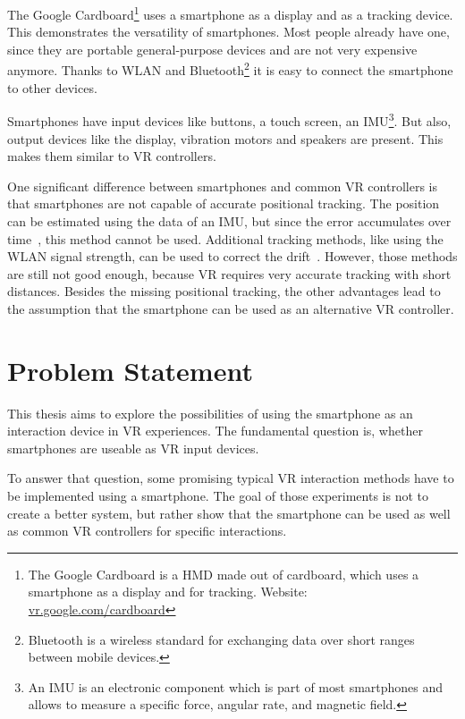 The Google Cardboard\footnote{The Google Cardboard is a \gls{HMD} made out of cardboard, which uses a smartphone as a display and for tracking. Website: \href{https://vr.google.com/cardboard/}{vr.google.com/cardboard}} uses a smartphone as a display and as a tracking device. This demonstrates the versatility of smartphones. Most people already have one, since they are portable general-purpose devices and are not very expensive anymore. Thanks to \gls{WLAN} and Bluetooth\footnote{Bluetooth is a wireless standard for exchanging data over short ranges between mobile devices.} it is easy to connect the smartphone to other devices.

Smartphones have input devices like buttons, a touch screen, an \gls{IMU}\footnote{An IMU is an electronic component which is part of most smartphones and allows to measure a specific force, angular rate, and magnetic field.}. But also, output devices like the display, vibration motors and speakers are present. This makes them similar to \gls{VR} controllers.

One significant difference between smartphones and common \gls{VR} controllers is that smartphones are not capable of accurate positional tracking. The position can be estimated using the data of an \gls{IMU}, but since the error accumulates over time~\cite[44]{Steed.2013}, this method cannot be used. Additional tracking methods, like using the \gls{WLAN} signal strength, can be used to correct the drift~\cite{Zhang.2015}. However, those methods are still not good enough, because \gls{VR} requires very accurate tracking with short distances.
Besides the missing positional tracking, the other advantages lead to the assumption that the smartphone can be used as an alternative \gls{VR} controller.


\section{Problem Statement}\label{section:problem-statement}
This thesis aims to explore the possibilities of using the smartphone as an interaction device in \gls{VR} experiences. The fundamental question is, whether smartphones are useable as \gls{VR} input devices.

To answer that question, some promising typical \gls{VR} interaction methods have to be implemented using a smartphone. The goal of those experiments is not to create a better system, but rather show that the smartphone can be used as well as common \gls{VR} controllers for specific interactions.

